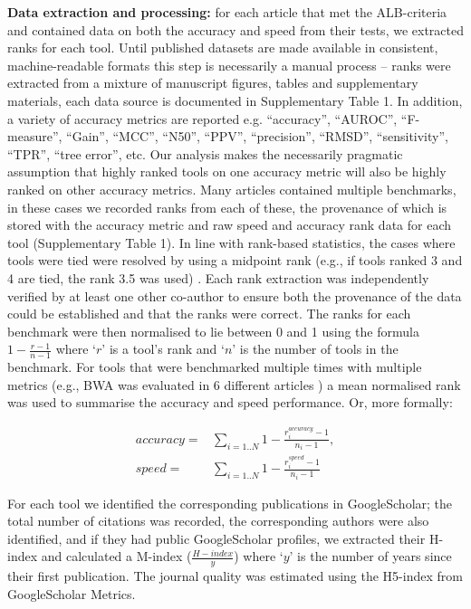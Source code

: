 \documentclass{bmcart}
\begin{document}
{\textbf{Data extraction and processing:} for each article that met the
ALB-criteria and contained data on both the accuracy and speed from
their tests, we extracted ranks for each tool. {\color{red}Until published datasets are made available in consistent, machine-readable formats this step is necessarily a manual process -- ranks were extracted from a mixture of manuscript figures, tables and supplementary materials, each data source is documented in Supplementary Table 1. In addition, a variety of accuracy metrics are reported e.g. ``accuracy'', ``AUROC'', ``F-measure'', ``Gain'', ``MCC'', ``N50'', ``PPV'', ``precision'', ``RMSD'', ``sensitivity'', ``TPR'', ``tree error'', etc. Our analysis makes the necessarily pragmatic assumption that highly ranked tools on one accuracy metric will also be highly ranked on other accuracy metrics.}
Many articles contained
multiple benchmarks, in these cases we recorded ranks from each of these, the
provenance of which is stored with the accuracy metric and raw speed
and accuracy rank data for each tool {\color{red}(Supplementary Table 1)}. In line with rank-based
statistics, the cases where tools were tied were resolved by using a
midpoint rank (e.g., if tools ranked 3 and 4 are tied, the rank 3.5 was used)
\cite{Mann1947-re}. Each rank extraction was independently verified by
at least one other co-author to ensure both the provenance of the data
could be established and that the ranks were correct. The ranks for
each benchmark were then normalised to lie between 0 and 1 using the
formula $1-\frac{r-1}{n-1}$ where ‘$r$’ is a tool’s rank and ‘$n$’ is the
number of tools in the benchmark. For tools that were benchmarked
multiple times with multiple metrics (e.g., BWA was evaluated in 6
different articles
\cite{Bao2011-lv,Caboche2014-lj,Hatem2013-cs,Schbath2012-ob,Ruffalo2011-rl,Holtgrewe2011-fd})
a mean normalised rank was used to summarise the accuracy and speed performance. 
Or, more formally:
 
\begin{equation*}
\begin{split}
accuracy =& \sum_{i=1..N} 1-\frac{r^{accuracy}_i-1}{n_i-1}, \\
speed    =& \sum_{i=1..N} 1-\frac{r^{speed   }_i-1}{n_i-1}
\end{split}
\end{equation*}
 
For each tool we identified the corresponding publications in
GoogleScholar; the total number of citations was recorded, the
corresponding authors were also identified, and if they had public
GoogleScholar profiles, we extracted their H-index and calculated a
M-index ($\frac{H-index}{y}$) where ‘$y$’ is the number of years since
their first publication. The journal quality was estimated using the H5-index
from GoogleScholar Metrics. 

}
\end{document}
